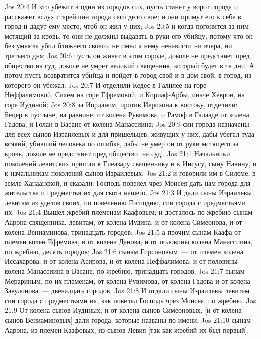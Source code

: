 \vs Jos 20:4 И кто убежит в один из городов сих, пусть станет у ворот города и расскажет вслух старейшин города сего дело свое; и они примут его к себе в город и дадут ему место, чтоб он жил у них;
\vs Jos 20:5 и когда погонится за ним мстящий за кровь, то они не должны выдавать в руки его убийцу, потому что он без умысла убил ближнего своего, не имел к нему ненависти ни вчера, ни третьего дня;
\vs Jos 20:6 пусть он живет в этом городе, доколе не предстанет пред общество на суд, доколе не умрет великий священник, который будет в те дни. А потом пусть возвратится убийца и пойдет в город свой и в дом свой, в город, из которого он убежал.
\vs Jos 20:7 И отделили Кедес в Галилее на горе Неффалимовой, Сихем на горе Ефремовой, и Кириаф-Арбы, иначе Хеврон, на горе Иудиной;
\vs Jos 20:8 за Иорданом, против Иерихона к востоку, отделили: Бецер в пустыне, на равнине, от колена Рувимова, и Рамоф в Галааде от колена Гадова, и Голан в Васане от колена Манассиина;
\vs Jos 20:9 сии города назначены для всех сынов Израилевых и для пришельцев, живущих у них, дабы убегал туда всякий, убивший человека по ошибке, дабы не умер он от руки мстящего за кровь, доколе не предстанет пред общество [на суд].
\vs Jos 21:1 Начальники поколений левитских пришли к Елеазару священнику и к Иисусу, сыну Навину, и к начальникам поколений сынов Израилевых,
\vs Jos 21:2 и говорили им в Силоме, в земле Ханаанской, и сказали: Господь повелел чрез Моисея дать нам города для жительства и предместья их для скота нашего.
\vs Jos 21:3 И дали сыны Израилевы левитам из уделов своих, по повелению Господню, сии города с предместьями их.
\vs Jos 21:4 Вышел жребий племенам Каафовым; и досталось по жребию сынам Аарона священника, левитам, от колена Иудина, и от колена Симеонова, и от колена Вениаминова, тринадцать городов;
\vs Jos 21:5 а прочим сынам Каафа от племен колен Ефремова, и от колена Данова, и от половины колена Манассиина, по жребию,  десять городов;
\vs Jos 21:6 сынам Гирсоновым~--- от племен колена Иссахарова, и от колена Асирова, и от колена Неффалимова, и от половины колена Манассиина в Васане, по жребию,  тринадцать городов;
\vs Jos 21:7 сынам Мерариным, по их племенам, от колена Рувимова, от колена Гадова и от колена Завулонова~--- двенадцать городов.
\vs Jos 21:8 И отдали сыны Израилевы левитам сии города с предместьями их, как повелел Господь чрез Моисея, по жребию.
\vs Jos 21:9 От колена сынов Иудиных, и от колена сынов Симеоновых, [и от колена сынов Вениаминовых] дали города, которые  названы по имени:
\vs Jos 21:10 сынам Аарона, из племен Каафовых, из сынов Левия [так как жребий их был первый],

